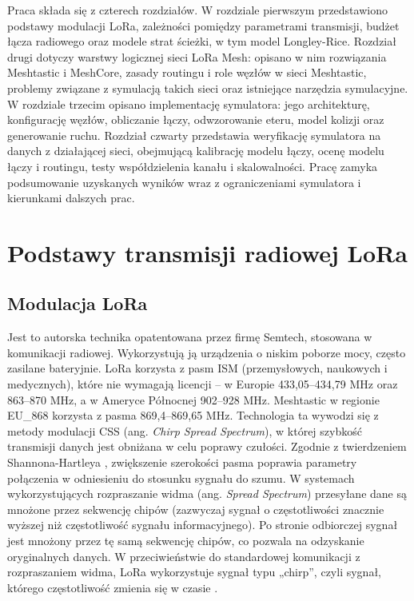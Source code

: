 \documentclass[12pt,a4paper,twoside]{report}
\theoremstyle{definition} %
\begin{document}
Praca składa się z czterech rozdziałów. W rozdziale pierwszym przedstawiono podstawy modulacji LoRa, zależności pomiędzy parametrami transmisji, budżet łącza radiowego oraz modele strat ścieżki, w tym model Longley-Rice. Rozdział drugi dotyczy warstwy logicznej sieci LoRa Mesh: opisano w nim rozwiązania Meshtastic i MeshCore, zasady routingu i role węzłów w sieci Meshtastic, problemy związane z symulacją takich sieci oraz istniejące narzędzia symulacyjne. W rozdziale trzecim opisano implementację symulatora: jego architekturę, konfigurację węzłów, obliczanie łączy, odwzorowanie eteru, model kolizji oraz generowanie ruchu. Rozdział czwarty przedstawia weryfikację symulatora na danych z działającej sieci, obejmującą kalibrację modelu łączy, ocenę modelu łączy i routingu, testy współdzielenia kanału i skalowalności. Pracę zamyka podsumowanie uzyskanych wyników wraz z ograniczeniami symulatora i kierunkami dalszych prac.
	
    \cleardoublepage %


        \chapter{Podstawy transmisji radiowej LoRa}

\section{Modulacja LoRa}
Jest to autorska technika opatentowana przez firmę Semtech, stosowana w komunikacji radiowej. Wykorzystują ją urządzenia o niskim poborze mocy, często zasilane bateryjnie. LoRa korzysta z pasm ISM (przemysłowych, naukowych i medycznych), które nie wymagają licencji – w Europie 433,05–434,79 MHz oraz 863–870 MHz, a w Ameryce Północnej 902–928 MHz. Meshtastic w regionie EU\_868 korzysta z pasma 869,4--869,65 MHz. Technologia ta wywodzi się z metody modulacji CSS (ang. \textit{Chirp Spread Spectrum}), w której szybkość transmisji danych jest obniżana w celu poprawy czułości. Zgodnie z twierdzeniem Shannona-Hartleya \cite{shannon1949}, zwiększenie szerokości pasma poprawia parametry połączenia w odniesieniu do stosunku sygnału do szumu. W systemach wykorzystujących rozpraszanie widma (ang. \textit{Spread Spectrum}) przesyłane dane są mnożone przez sekwencję chipów (zazwyczaj sygnał o częstotliwości znacznie wyższej niż częstotliwość sygnału informacyjnego). Po stronie odbiorczej sygnał jest mnożony przez tę samą sekwencję chipów, co pozwala na odzyskanie oryginalnych danych. W przeciwieństwie do standardowej komunikacji z rozpraszaniem widma, LoRa wykorzystuje sygnał typu „chirp”, czyli sygnał, którego częstotliwość zmienia się w czasie \cite{semtech_an1200_22}.
\end{document}
